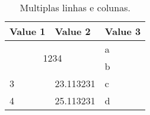 \documentclass{article}
\begin{document}
\newpage

\begin{table}[h!]
	\begin{center}
		\begin{tabular}{l|l|l}
			\textbf{Value 1} & \textbf{Value 2} & \textbf{Value 3} \\
			\hline
			\multicolumn{2}{c|}{\multirow{2}{*}{1234}} & a\\
			\multicolumn{2}{c|}{} & b\\
			\hline
			3                & 23.113231        & c                \\
			4                & 25.113231        & d                \\
		\end{tabular}
		\caption{Multiplas linhas e colunas.}
		\label{tab:table1}
	\end{center}
\end{table}

\newpage
\end{document}
